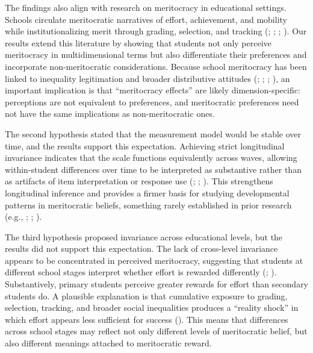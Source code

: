 \documentclass[
  13pt,
]{article}
\begin{document}
The findings also align with research on meritocracy in educational
settings. Schools circulate meritocratic narratives of effort,
achievement, and mobility while institutionalizing merit through
grading, selection, and tracking
(;
;
;
). Our results
extend this literature by showing that students not only perceive
meritocracy in multidimensional terms but also differentiate their
preferences and incorporate non-meritocratic considerations. Because
school meritocracy has been linked to inequality legitimation and
broader distributive attitudes
(;
;
;
), an
important implication is that ``meritocracy effects'' are likely
dimension-specific: perceptions are not equivalent to preferences, and
meritocratic preferences need not have the same implications as
non-meritocratic ones.

The second hypothesis stated that the measurement model would be stable
over time, and the results support this expectation. Achieving strict
longitudinal invariance indicates that the scale functions equivalently
across waves, allowing within-student differences over time to be
interpreted as substantive rather than as artifacts of item
interpretation or response use (; ; ). This strengthens longitudinal inference and
provides a firmer basis for studying developmental patterns in
meritocratic beliefs, something rarely established in prior research
(e.g., ;
;
).

The third hypothesis proposed invariance across educational levels, but
the results did not support this expectation. The lack of cross-level
invariance appears to be concentrated in perceived meritocracy,
suggesting that students at different school stages interpret whether
effort is rewarded differently
(;
).
Substantively, primary students perceive greater rewards for effort than
secondary students do. A plausible explanation is that cumulative
exposure to grading, selection, tracking, and broader social
inequalities produces a ``reality shock'' in which effort appears less
sufficient for success (). This means that differences across school stages may
reflect not only different levels of meritocratic belief, but also
different meanings attached to meritocratic reward.
\end{document}
